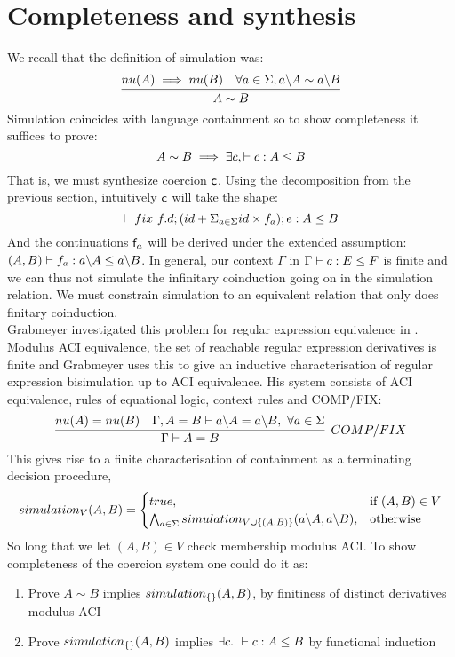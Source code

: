 \documentclass[a4paper,UKenglish,cleveref, autoref, thm-restate]{lipics-v2021}
\begin{document}
\section{Completeness and synthesis}
We recall that the definition of simulation was:
\[\infer={A \sim B}{\mynu{A} \implies \mynu{B} & \forall a \in \Sigma, \derive{a}{A} \sim \derive{a}{B} }\]
Simulation coincides with language containment so to show completeness it suffices to prove:
\[ A \sim B \implies \exists c, \contains{}{c}{A}{B} \]
That is, we must synthesize coercion $\textsf{c}$. Using the decomposition from the previous section, intuitively $\textsf{c}$ will take the shape:
\[\contains{}{\fix ~f.d;(id + \Sigma_{a \in \Sigma} id\times f_a); e}{A}{B}\]
And the continuations $\textsf{f}_a$ will be derived under the extended assumption: $\contains{(A,B)}{f_a}{\derive{a}{A}}{\derive{a}{B}}$. In general, our context $\Gamma$ in $\containsG{c}{E}{F}$ is finite and we can thus not simulate the infinitary coinduction going on in the simulation relation. We must constrain simulation to an equivalent relation that only does finitary coinduction.\\
Grabmeyer investigated this problem for regular expression equivalence in \cite{G05}.
Modulus ACI equivalence, the set of reachable regular expression derivatives is finite and Grabmeyer uses this to give an inductive characterisation of regular expression bisimulation up to ACI equivalence. His system consists of ACI equivalence, rules of equational logic, context rules and COMP/FIX:
\[\infer[\mathsf{COMP/FIX}]{\Gamma \vdash A =  B}{\mynu{A} =  \mynu{B} & \Gamma, A = B \vdash \derive{a}{A} = \derive{a}{B},~\forall a \in \Sigma}\] 
This gives rise to a finite characterisation of containment as a terminating decision procedure,
\begin{align}
\simulationb{V}{A}{B} =\begin{cases}
			\true, & \text{if }(A,B) \in V\\
                      \bigwedge_{a \in \Sigma}\simulationb{V \cup \{(A,B)\}}{\derive{a}{A}}{\derive{a}{B}}, & \text{otherwise}
		 \end{cases}
\end{align}
So long that we let $(A,B) \in V$ check membership modulus ACI. To show completeness of the coercion system one could do it as:
\begin{enumerate}
\item Prove $A \sim B$ implies $\simulationb{\{\}}{A}{B}$, by finitiness of distinct derivatives modulus ACI
\item Prove $\simulationb{\{\}}{A}{B}$ implies $\exists c.~\contains{}{c}{A}{B}$ by functional induction
\end{enumerate}
\end{document}
